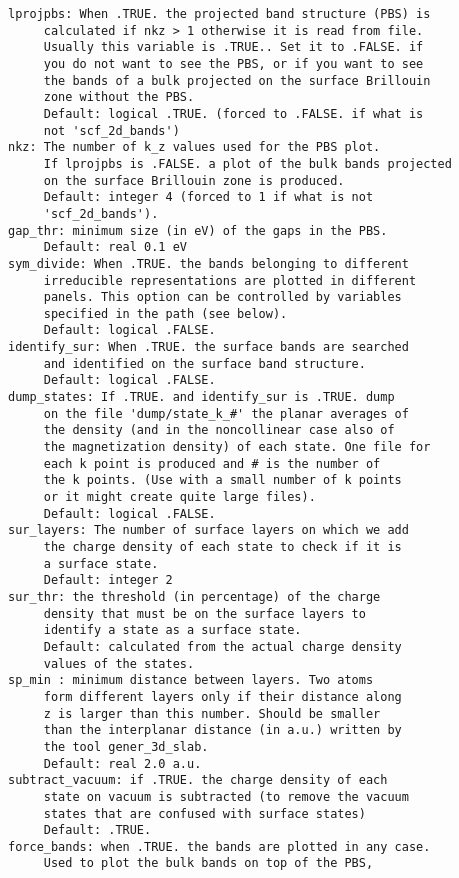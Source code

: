 \documentclass[12pt,a4paper,twoside]{report}
\begin{document}
\begin{verbatim}
lprojpbs: When .TRUE. the projected band structure (PBS) is 
     calculated if nkz > 1 otherwise it is read from file. 
     Usually this variable is .TRUE.. Set it to .FALSE. if 
     you do not want to see the PBS, or if you want to see 
     the bands of a bulk projected on the surface Brillouin 
     zone without the PBS.
     Default: logical .TRUE. (forced to .FALSE. if what is 
     not 'scf_2d_bands')
nkz: The number of k_z values used for the PBS plot. 
     If lprojpbs is .FALSE. a plot of the bulk bands projected 
     on the surface Brillouin zone is produced.
     Default: integer 4 (forced to 1 if what is not 
     'scf_2d_bands').
gap_thr: minimum size (in eV) of the gaps in the PBS.
     Default: real 0.1 eV
sym_divide: When .TRUE. the bands belonging to different 
     irreducible representations are plotted in different 
     panels. This option can be controlled by variables 
     specified in the path (see below).
     Default: logical .FALSE.
identify_sur: When .TRUE. the surface bands are searched 
     and identified on the surface band structure. 
     Default: logical .FALSE.
dump_states: If .TRUE. and identify_sur is .TRUE. dump 
     on the file 'dump/state_k_#' the planar averages of 
     the density (and in the noncollinear case also of 
     the magnetization density) of each state. One file for 
     each k point is produced and # is the number of 
     the k points. (Use with a small number of k points 
     or it might create quite large files).
     Default: logical .FALSE.
sur_layers: The number of surface layers on which we add 
     the charge density of each state to check if it is 
     a surface state.
     Default: integer 2
sur_thr: the threshold (in percentage) of the charge 
     density that must be on the surface layers to 
     identify a state as a surface state.
     Default: calculated from the actual charge density 
     values of the states.
sp_min : minimum distance between layers. Two atoms 
     form different layers only if their distance along 
     z is larger than this number. Should be smaller 
     than the interplanar distance (in a.u.) written by 
     the tool gener_3d_slab.
     Default: real 2.0 a.u.
subtract_vacuum: if .TRUE. the charge density of each 
     state on vacuum is subtracted (to remove the vacuum 
     states that are confused with surface states)
     Default: .TRUE.
force_bands: when .TRUE. the bands are plotted in any case.
     Used to plot the bulk bands on top of the PBS, 

\end{verbatim}
\end{document}
